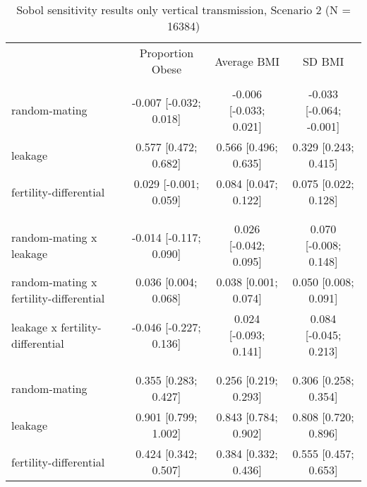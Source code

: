 
\begin{table}[htp]
\renewcommand{\arraystretch}{1.3}
\setlength{\tabcolsep}{5pt}
\caption{Sobol sensitivity results only vertical transmission, Scenario 2 (N = 16384)}
\label{tab:sobol}
\footnotesize
\centering
\begin{threeparttable}
\begin{tabular}{lccc}
\hline
\addlinespace
& Proportion Obese & Average BMI & SD BMI \\
\addlinespace
\hline
\addlinespace[6pt]
\multicolumn{4}{l}{\hspace{1em} S1} \\
\hspace{1.5em} random-mating & -0.007 [-0.032; 0.018]   & -0.006 [-0.033; 0.021]   & -0.033 [-0.064; -0.001] \\
	  \hspace{1.5em} leakage & 0.577 [0.472; 0.682]   & 0.566 [0.496; 0.635]   & 0.329 [0.243; 0.415] \\
	  \hspace{1.5em} fertility-differential & 0.029 [-0.001; 0.059]   & 0.084 [0.047; 0.122]   & 0.075 [0.022; 0.128] \\
	 \\
\addlinespace[12pt]
\multicolumn{4}{l}{\hspace{1em} S2} \\ 
\hspace{1.5em} random-mating x leakage & -0.014 [-0.117; 0.090]   & 0.026 [-0.042; 0.095]   & 0.070 [-0.008; 0.148] \\
	  \hspace{1.5em} random-mating x fertility-differential & 0.036 [0.004; 0.068]   & 0.038 [0.001; 0.074]   & 0.050 [0.008; 0.091] \\
	  \hspace{1.5em} leakage x fertility-differential & -0.046 [-0.227; 0.136]   & 0.024 [-0.093; 0.141]   & 0.084 [-0.045; 0.213] \\
	 \\
\addlinespace[12pt]
\multicolumn{4}{l}{\hspace{1em} ST} \\ 
\hspace{1.5em} random-mating & 0.355 [0.283; 0.427]   & 0.256 [0.219; 0.293]   & 0.306 [0.258; 0.354] \\
	  \hspace{1.5em} leakage & 0.901 [0.799; 1.002]   & 0.843 [0.784; 0.902]   & 0.808 [0.720; 0.896] \\
	  \hspace{1.5em} fertility-differential & 0.424 [0.342; 0.507]   & 0.384 [0.332; 0.436]   & 0.555 [0.457; 0.653] \\

\end{tabular}
\end{threeparttable}
\end{table}
